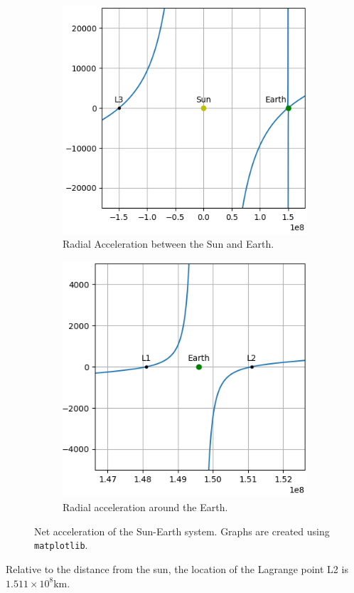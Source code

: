 \begin{figure}[h!]
	\centering
	\captionsetup[subfigure]{justification=centering}
	\begin{subfigure}[b]{0.4\textwidth}
		\centering
		\includegraphics[scale=0.6]{r-accel-figure-1.png}
		\caption{\footnotesize Radial Acceleration between the Sun and Earth.}
		\label{fig:radial-accel-system}
	\end{subfigure}
	\hspace*{1cm}
	\begin{subfigure}[b]{0.4\textwidth}
		\centering
		\includegraphics[scale=0.6]{r-accel-figure-2.png}
		\caption{\footnotesize Radial acceleration around the Earth.\vspace*{1.16em}}
		\label{fig:radial-accel-earth}
	\end{subfigure}
	\label{fig:radial-accel}
	\caption{Net acceleration of the Sun-Earth system. Graphs are created using \texttt{matplotlib}.}
\end{figure} %

Relative to the distance from the sun, the location of the Lagrange point L2 is $1.511\times10^8 \si{\kilo\metre}$.